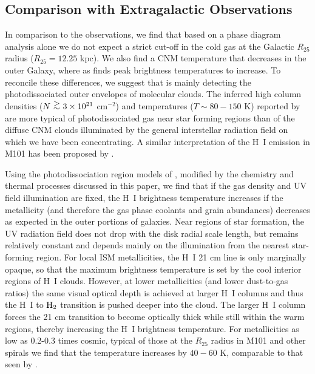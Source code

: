 \documentclass[12pt,preprint,flushrt]{aastex}
\newcommand{\ag}{\mbox{ \raisebox{-.4ex}{$\stackrel{\textstyle >}{\sim}$} }}
\begin{document}
\subsection{Comparison with Extragalactic Observations}
\label{sub:extragalobs}

In comparison to the \cite{braun97} observations, we find that based
on a phase diagram analysis alone we do not expect a strict cut-off
in the cold gas at the Galactic $R_{25}$ radius
($R_{25} = 12.25$ kpc). We also find a
CNM temperature that decreases in the outer Galaxy,
where as \cite{braun97} finds peak brightness temperatures to increase.
To reconcile these differences, we suggest
that \cite{braun97}
is mainly detecting the photodissociated outer
envelopes of molecular clouds. The inferred high column densities
($N\ag 3\times 10^{21}$ cm$^{-2}$)
and temperatures ($T\sim 80-150$ K) reported by \cite{braun97}
are more typical of photodissociated
gas near star forming regions
than of the diffuse CNM clouds illuminated by the general interstellar
radiation field on which we have been
concentrating. A similar interpretation of the H~I emission in M101 has
been proposed by \cite{smith00}.

Using the photodissociation region models of
\cite{kauf99}, modified by the chemistry and
thermal processes discussed in this paper,  we find that if the gas density and
UV field illumination are fixed, the H~I brightness temperature increases
if the metallicity (and therefore the gas phase coolants and grain abundances)
decreases
as expected in the outer portions of galaxies.
Near regions of star formation, the UV radiation field does not drop
with the disk radial scale length, but remains relatively constant
and depends mainly on the
illumination from the nearest star-forming region.
For local ISM  metallicities,
the H~I 21 cm line is only marginally opaque,
so that the maximum brightness temperature is set by the cool interior
regions of H~I clouds.  However,
at lower
metallicities (and lower dust-to-gas ratios) the same visual optical
depth is achieved at larger H~I columns and thus the H~I to ${\rm H_2}$
transition is pushed deeper into the cloud.
The larger H~I column
forces the 21 cm transition to become optically thick while still
within the warm regions, thereby increasing the H~I brightness
temperature. For metallicities as low as 0.2-0.3 times cosmic, typical 
of those
at the $R_{25}$ radius in M101 and other spirals \citep{gar97}
we find  that the temperature
increases by $40-60$ K, comparable to that seen by \cite{braun97}.
\end{document}

